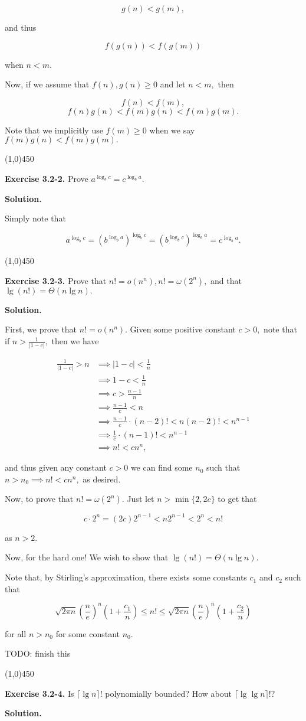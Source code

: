 \documentclass{article}
\newcommand{\exec}[2]
{\textbf{Exercise #1.} #2

\textbf{Solution.}}
\newcommand{\bardiv}{\begin{center}
\line(1,0){450}
\end{center}}
\begin{document}
$$g(n) < g(m),$$

and thus

$$f(g(n)) < f(g(m))$$

when $n < m.$ 

Now, if we assume that $f(n), g(n) \geq 0$ and let $n < m,$ then

$$f(n) < f(m),$$
$$f(n)g(n) < f(m)g(n) < f(m)g(m).$$

Note that we implicitly use $f(m) \geq 0$ when we say $f(m)g(n) < f(m)g(m).$

\bardiv

\exec{3.2-2}{Prove $a^{\log_b c} = c^{\log_b a}.$}

Simply note that

$$a^{\log_b c} = (b^{\log_b a})^{\log_b c} = (b^{\log_b c})^{\log_b a} = c^{\log_b a}.$$

\bardiv

\exec{3.2-3}{Prove that $n! = o(n^n), n! = \omega(2^n),$ and that $\lg(n!) = \Theta(n \lg n).$}

First, we prove that $n! = o(n^n).$ Given some positive constant $c > 0,$ note that if $n > \frac{1}{|1-c|},$ then we have

\begin{align*}
\frac{1}{|1-c|} > n &\implies |1-c| < \frac{1}{n} \\
		    &\implies 1-c < \frac{1}{n} \\
		    &\implies c > \frac{n-1}{n} \\
		    &\implies \frac{n-1}{c} < n \\
		    &\implies \frac{n-1}{c} \cdot (n-2)! < n(n-2)! < n^{n-1} \\
		    &\implies \frac{1}{c} \cdot (n-1)! < n^{n-1} \\
		    &\implies n! < cn^n,
\end{align*}

and thus given any constant $c > 0$ we can find some $n_0$ such that $n > n_0 \implies n! < cn^n,$ as desired.

Now, to prove that $n! = \omega(2^n).$ Just let $n > \min\{2, 2c\}$ to get that

$$c\cdot 2^n = (2c)2^{n-1} < n2^{n-1} < 2^n < n!$$

as $n > 2.$

Now, for the hard one! We wish to show that $\lg(n!) = \Theta(n\lg n).$

Note that, by Stirling's approximation, there exists some constants $c_1$ and $c_2$ such that

$$\sqrt{2\pi n}\left(\frac{n}{e}\right)^n \left(1+\frac{c_1}{n}\right) \leq n! \leq \sqrt{2\pi n}\left(\frac{n}{e}\right)^n \left(1+\frac{c_2}{n}\right)$$

for all $n > n_0$ for some constant $n_0.$

TODO: finish this

\bardiv

\exec{3.2-4}{Is $\lceil \lg n\rceil !$ polynomially bounded? How about $\lceil \lg \lg n\rceil !?$}
\end{document}
